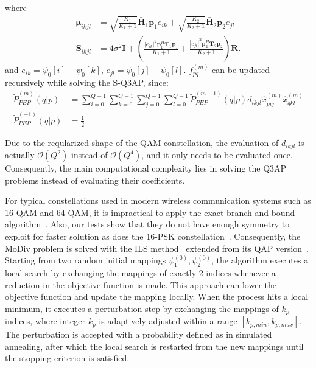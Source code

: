 \documentclass[journal,draftcls,onecolumn,12pt,twoside]{IEEEtran}
\begin{document}
where 
\begin{subequations}
  \begin{align}
    \bm{\mu}_{ikjl} & = \sqrt{\frac{K_1}{K_1+1}}\bar{\mathbf{H}}_1\mathbf{p}_1
    e_{ik} + \sqrt{\frac{K_2}{K_2+1}}\bar{\mathbf{H}}_2\mathbf{p}_2e_{jl} \\
    \mathbf{S}_{ikjl} & = 4\sigma^2\mathbf{I} + \left(\frac{|e_{ik}|^2
    \mathbf{p}_1^H\mathbf{T}_1 \mathbf{p}_1}{K_1+1} + \frac{|e_{jl}|^2
    \mathbf{p}_2^H\mathbf{T}_2 \mathbf{p}_2}{K_2+1}\right) \mathbf{R}.
  \end{align}
\end{subequations}
and $e_{ik} = \psi_0[i] - \psi_0[k]$, $e_{jl} = \psi_0[j] - \psi_0[l]$.
$f_{pq}^{(m)}$ can be updated recursively while solving the S-Q3AP, since:
\begin{subequations}
  \begin{align}
    \tilde{P}_{PEP}^{(m)}(q|p) & =
    \sum_{i=0}^{Q-1}\sum_{k=0}^{Q-1}\sum_{j=0}^{Q-1}
    \sum_{l=0}^{Q-1}\tilde{P}_{PEP}^{(m-1)}(q|p)d_{ikjl}
    \hat{x}_{pij}^{(m)}\hat{x}_{qkl}^{(m)}
    \\
    \tilde{P}_{PEP}^{(-1)}(q|p) & = \frac{1}{2}
  \end{align}
  \label{eq:pep_update}
\end{subequations}

Due to the reqularized shape of the QAM constellation, the evaluation of
$d_{ikjl}$ is actually $\mathcal{O}(Q^2)$ instead of $\mathcal{O}(Q^4)$, and
it only needs to be evaluated once. Consequently, the main computational
complexity lies in solving the Q3AP problems instead of evaluating their
coefficients.

For typical constellations used in modern wireless communication systems such as
16-QAM and 64-QAM, it is impractical to apply the exact branch-and-bound
algorithm~\cite{hahn2008quadratic}. Also, our tests show that they do not have
enough symmetry to exploit for faster solution as does the 16-PSK
constellation~\cite{mittelmann2015solving}.
Consequently, the MoDiv problem is solved with the ILS
method~\cite{hahn2008quadratic} extended from its QAP
version~\cite{stutzle2006iterated}. Starting from two random initial mappings
$\psi_1^{(0)}, \psi_2^{(0)}$, the algorithm executes a local search by
exchanging the mappings of exactly 2 indices whenever a reduction in the
objective function is made. This approach can lower the objective function and
update the mapping locally. When the process hits a local minimum, it executes a
perturbation step by exchanging the mappings of $k_p$ indices, where integer
$k_p$ is adaptively adjusted within a range $[k_{p,min}, k_{p,max}]$. The
perturbation is accepted with a probability defined as in simulated annealing,
after which the local search is restarted from the new mappings until the
stopping criterion is satisfied.
\end{document}
